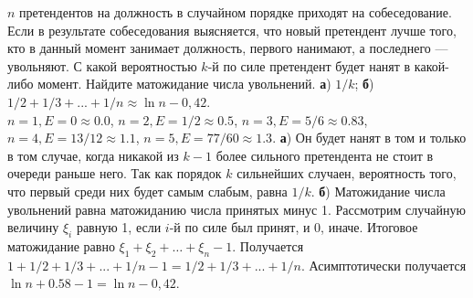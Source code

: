 \documentclass[a4paper,11pt]{article}
\begin{document}
$n$ претендентов на должность в случайном порядке приходят на собеседование.
Если в результате собеседования выясняется, что новый претендент лучше того, кто в данный момент занимает должность, первого нанимают, а последнего --- увольняют.
 С какой вероятностью $k$-й по силе претендент будет нанят в какой-либо момент.
 Найдите матожидание числа увольнений.
\textbf{а}) $1/k$; \textbf{б}) $1/2 + 1/3 + ... + 1/n \approx \ln n - 0{,}42$.
\\$n = 1, E = 0 \approx 0.0$, $n = 2, E = 1/2 \approx 0.5$, $n = 3, E = 5/6 \approx 0.83$, $n = 4, E = 13/12 \approx 1.1$, $n = 5, E = 77/60 \approx 1.3$.
\textbf{а}) Он будет нанят в том и только в том случае, когда никакой из $k-1$ более сильного претендента не стоит в очереди раньше него. Так как порядок $k$ сильнейших случаен, вероятность того, что первый среди них будет самым слабым, равна $1/k$.
\textbf{б})
Матожидание числа увольнений равна матожиданию числа принятых минус 1.
Рассмотрим случайную величину $\xi_i$ равную 1, если $i$-й по силе был принят, и 0, иначе.
Итоговое матожидание равно $\xi_1+\xi_2+\ldots+\xi_n-1$.
Получается $1+1/2+1/3+...+1/n - 1 = 1/2 + 1/3 + ... + 1/n$.
Асимптотически получается $\ln n + 0.58 - 1 = \ln n - 0{,}42$.
\end{document}
